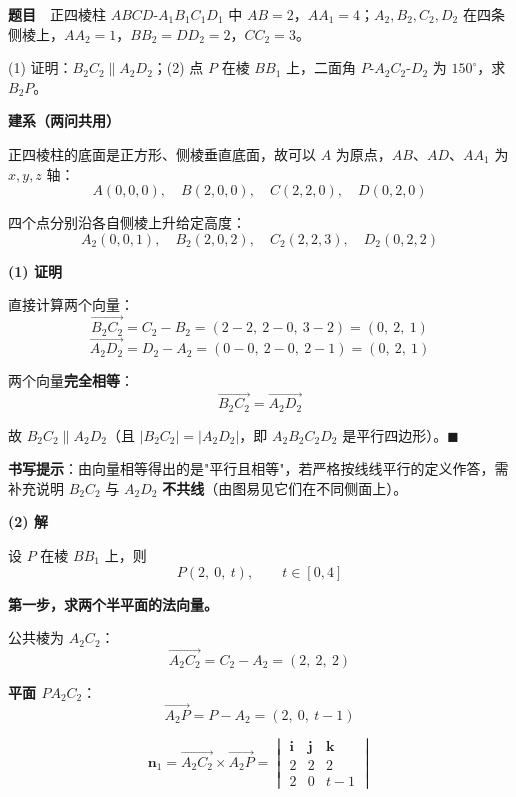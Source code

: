 
\textbf{题目}　正四棱柱 $ABCD\text{-}A_1B_1C_1D_1$ 中 $AB=2$，$AA_1=4$；$A_2,B_2,C_2,D_2$ 在四条侧棱上，$AA_2=1$，$BB_2=DD_2=2$，$CC_2=3$。

\begin{center}\end{center}

  (1) 证明：$B_2C_2\parallel A_2D_2$；(2) 点 $P$ 在棱 $BB_1$ 上，二面角 $P\text{-}A_2C_2\text{-}D_2$ 为 $150^\circ$，求 $B_2P$。

\par\medskip

\textbf{建系（两问共用）}

正四棱柱的底面是正方形、侧棱垂直底面，故可以 $A$ 为原点，$AB$、$AD$、$AA_1$ 为 $x,y,z$ 轴：
\[A(0,0,0),\quad B(2,0,0),\quad C(2,2,0),\quad D(0,2,0)\]

四个点分别沿各自侧棱上升给定高度：
\[A_2(0,0,1),\quad B_2(2,0,2),\quad C_2(2,2,3),\quad D_2(0,2,2)\]

\par\medskip

\textbf{(1) 证明}

直接计算两个向量：
\[\overrightarrow{B_2C_2}=C_2-B_2=(2-2,\ 2-0,\ 3-2)=(0,\ 2,\ 1)\]
\[\overrightarrow{A_2D_2}=D_2-A_2=(0-0,\ 2-0,\ 2-1)=(0,\ 2,\ 1)\]

两个向量\textbf{完全相等}：
\[\overrightarrow{B_2C_2}=\overrightarrow{A_2D_2}\]

故 $B_2C_2\parallel A_2D_2$（且 $\left|B_2C_2\right|=\left|A_2D_2\right|$，即 $A_2B_2C_2D_2$ 是平行四边形）。$\blacksquare$

\begin{gktip}
\textbf{书写提示}：由向量相等得出的是"平行且相等"，若严格按线线平行的定义作答，需补充说明 $B_2C_2$ 与 $A_2D_2$ \textbf{不共线}（由图易见它们在不同侧面上）。
\end{gktip}

\par\medskip

\textbf{(2) 解}

设 $P$ 在棱 $BB_1$ 上，则
\[P(2,\ 0,\ t),\qquad t\in[0,4]\]

\textbf{第一步，求两个半平面的法向量。}

公共棱为 $A_2C_2$：
\[\overrightarrow{A_2C_2}=C_2-A_2=(2,\ 2,\ 2)\]

\textbf{平面 $PA_2C_2$}：
\[\overrightarrow{A_2P}=P-A_2=(2,\ 0,\ t-1)\]

\[\boldsymbol n_1=\overrightarrow{A_2C_2}\times\overrightarrow{A_2P}=\begin{vmatrix}\boldsymbol i&\boldsymbol j&\boldsymbol k\\ 2&2&2\\ 2&0&t-1\end{vmatrix}\]

